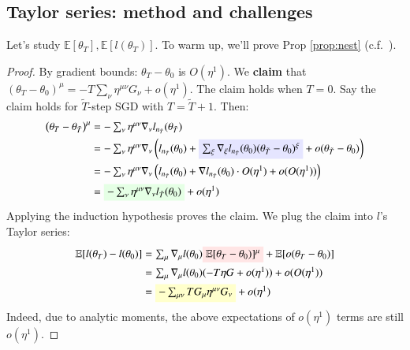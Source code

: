 \documentclass[anon,12pt]{colt2021} %
\newcommand{\translucent}[2]{\colorbox{#1}{#2}}
\newcommand{\squash}{\vspace{-0.15cm}}
\newcommand{\wrap}[1]{\left(#1\right)}
\newcommand{\expc}{\mathbb{E}}
\newcommand{\expct}[1]{\mathbb{E}\left[#1\right]}
\begin{document}
        \subsection{Taylor series: method and challenges}\label{sect:challenges}
            Let's study $\expct{\theta_T}, \expct{l(\theta_T)}$.  To warm
            up, we'll prove Prop \ref{prop:nest} (c.f.\ \cite{ne04,ro18}). 
            \begin{proof} %
                By gradient bounds: $\theta_T - \theta_0$ is $O(\eta^1)$.
                We \textbf{claim} that $(\theta_T - \theta_0)^\mu =
                -T\sum_\nu \eta^{\mu\nu}G_\nu + o(\eta^1)$.
                The claim holds when $T=0$.  Say the claim holds for
                ${\tilde T}$-step SGD with
                $T = {\tilde T}+1$.  Then:\squash
                \begin{align*}
                    \wrap{\theta_{T} - \theta_{{\tilde T}}}^\mu
                    &= - \textstyle\sum_{\nu} \eta^{\mu\nu} \nabla_\nu l_{n_{\tilde T}}(\theta_{{\tilde T}}) \\
                    &= - \textstyle\sum_{\nu} \eta^{\mu\nu} \nabla_\nu \wrap{
                             l_{n_{\tilde T}}(\theta_0)
                             + \text{\translucent{moosky}{$\sum_{\xi} \nabla_\xi l_{n_{\tilde T}}(\theta_0) (\theta_{{\tilde T}} - \theta_0)^\xi$}}
                             + o(\theta_{{\tilde T}} - \theta_0)
                         } \\ 
                    &= - \textstyle\sum_{\nu} \eta^{\mu\nu} \nabla_\nu \wrap{
                                l_{n_{\tilde T}}(\theta_0)
                                + \nabla l_{n_{\tilde T}}(\theta_0) \cdot O(\eta^1) + o(O(\eta^1))
                            } \\
                    &= \textstyle\text{\translucent{moolime}{$- \sum_\nu \eta^{\mu\nu} \nabla_\nu l_{{\tilde T}}(\theta_0)$}} + o(\eta^1)
                \end{align*}
                Applying the induction hypothesis proves the claim.
                We plug the claim into $l$'s Taylor series:
                \begin{align*}
                    \expc[l(\theta_T) - l(\theta_0)]
                    &= \textstyle \sum_\mu \nabla_\mu l(\theta_0) \text{\translucent{moopink}{$\expc[\theta_T - \theta_0)]^\mu$}} + \expc[o(\theta_T - \theta_0)] \\
                    &= \textstyle \sum_\mu \nabla_\mu l(\theta_0) (-T\eta G + o(\eta^1)) + o(O(\eta^1)) \\
                    &= \textstyle \text{\translucent{moogold}{$- \sum_{\mu\nu} T G_\mu \eta^{\mu\nu} G_\nu$}}+ o(\eta^1)
                \end{align*}
                Indeed, due to analytic moments, the above expectations of
                $o(\eta^1)$ terms are still $o(\eta^1)$.
            \end{proof}
\end{document}
